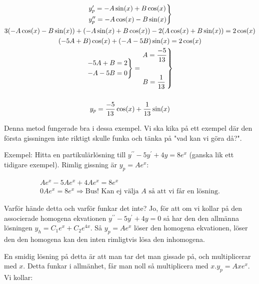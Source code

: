 \begin{equation*}
  \begin{gathered}
    \begin{rcases*}
      y_p^{\prime} = -A\sin(x)+B\cos(x)\\
      y_p^{\prime\prime}=-A\cos(x)-B\sin(x)
    \end{rcases*}\\
    3(-A\cos(x)-B\sin(x))+(-A\sin(x)+B\cos(x))-2(A\cos(x)+B\sin(x))=2\cos(x)\\
    (-5A+B)\cos(x)+(-A-5B)\sin(x) = 2\cos(x)\\
    \begin{rcases*}
      -5A+B=2\\
      -A-5B=0
    \end{rcases*}=
    \begin{rcases*}
      A=\dfrac{-5}{13}\\\\
      B=\dfrac{1}{13}
    \end{rcases*}\\\\
    y_p = \dfrac{-5}{13}\cos(x)+\dfrac{1}{13}\sin(x)
  \end{gathered}
\end{equation*}
\par\bigskip
\noindent Denna metod fungerade bra i dessa exempel. Vi ska kika på ett exempel där den första gissningen inte riktigt skulle funka och tänka på "vad kan vi göra då?".
\par\bigskip
\noindent Exempel: Hitta en partikulärlösning till $y^{\prime\prime}-5y^{\prime}+4y=8e^x$ (ganska lik ett tidigare exempel). Rimlig gissning är $y_p = Ae^x$:


\begin{equation*}
  \begin{gathered}
    Ae^x-5Ae^x+4Ae^x=8e^x\\
    0Ae^x=8e^x \Rightarrow\text{Bus! Kan ej välja $A$ så att vi får en lösning}.
  \end{gathered}
\end{equation*}
\par\bigskip
\noindent Varför hände detta och varför funkar det inte? Jo, för att om vi kollar på den associerade homogena ekvationen $y^{\prime\prime}-5y^{\prime}+4y=0$ så har den den allmänna lösningen $y_h=C_1e^x+C_2e^{4x}$. Så $y_p =Ae^x$ löser den homogena ekvationen, löser den den homogena kan den inten rimligtvis lösa den inhomogena.
\par\bigskip
\noindent En smidig lösning på detta är att man tar det man gissade på, och multiplicerar med $x$. Detta funkar i allmänhet, får man noll så multiplicera med $x$.$y_p = Axe^x$. Vi kollar:


